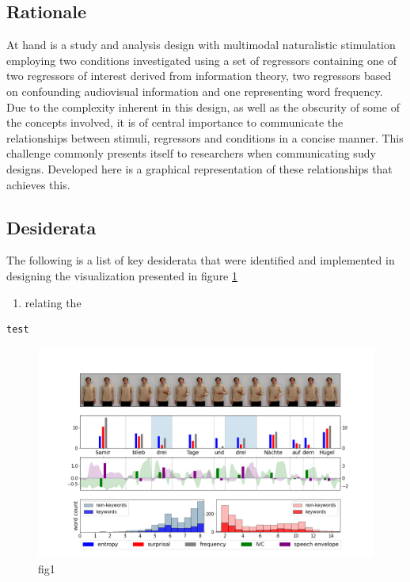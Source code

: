 \documentclass[12pt, letterpaper]{article}
\begin{document}
\subsection{Rationale}
At hand is a study and analysis design with multimodal naturalistic stimulation employing two conditions investigated using a set of regressors containing one of two regressors of interest derived from information theory, two regressors based on confounding audiovisual information and one representing word frequency.
Due to the complexity inherent in this design, as well as the obscurity of some of the concepts involved, it is of central importance to communicate the relationships between stimuli, regressors and conditions in a concise manner. This challenge commonly presents itself to researchers when communicating sudy designs. 
Developed here is a graphical representation of these relationships that achieves this.

\subsection{Desiderata} %
The following is a list of key desiderata that were identified and implemented in designing the visualization presented in figure \ref{fig:1}

\begin{enumerate}
	\item{relating the }


\end{enumerate}

\begin{verbatim}
test
\end{verbatim}


\begin{figure}
  \includegraphics[width=\linewidth]{figure1.png}
  \caption{fig1}
  \label{fig:1}
\end{figure}
\end{document}
